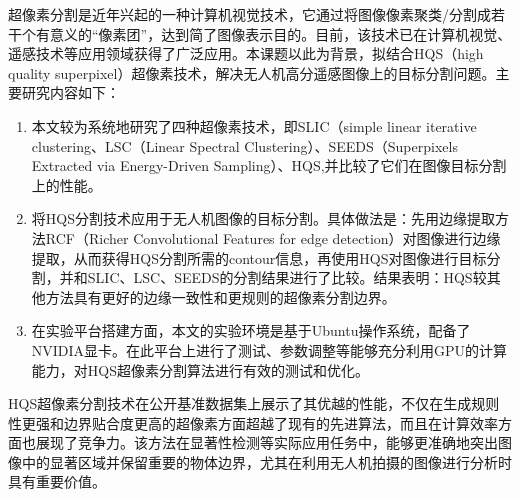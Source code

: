 超像素分割是近年兴起的一种计算机视觉技术，它通过将图像像素聚类/分割成若干个有意义的“像素团”，达到简了图像表示目的。目前，该技术已在计算机视觉、遥感技术等应用领域获得了广泛应用。本课题以此为背景，拟结合HQS（high quality superpixel）超像素技术，解决无人机高分遥感图像上的目标分割问题。主要研究内容如下：

\begin{enumerate}
\item 本文较为系统地研究了四种超像素技术，即SLIC（simple linear iterative clustering、LSC（Linear Spectral Clustering）、SEEDS（Superpixels Extracted via Energy-Driven Sampling）、HQS,并比较了它们在图像目标分割上的性能。

\item 将HQS分割技术应用于无人机图像的目标分割。具体做法是：先用边缘提取方法RCF（Richer Convolutional Features for edge detection）对图像进行边缘提取，从而获得HQS分割所需的contour信息，再使用HQS对图像进行目标分割，并和SLIC、LSC、SEEDS的分割结果进行了比较。结果表明：HQS较其他方法具有更好的边缘一致性和更规则的超像素分割边界。

\item 在实验平台搭建方面，本文的实验环境是基于Ubuntu操作系统，配备了NVIDIA显卡。在此平台上进行了测试、参数调整等能够充分利用GPU的计算能力，对HQS超像素分割算法进行有效的测试和优化。
\end{enumerate}

HQS超像素分割技术在公开基准数据集上展示了其优越的性能，不仅在生成规则性更强和边界贴合度更高的超像素方面超越了现有的先进算法，而且在计算效率方面也展现了竞争力。该方法在显著性检测等实际应用任务中，能够更准确地突出图像中的显著区域并保留重要的物体边界，尤其在利用无人机拍摄的图像进行分析时具有重要价值。
